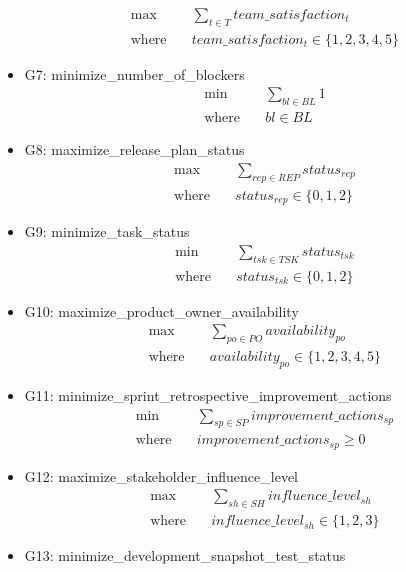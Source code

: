 \documentclass{article}
\begin{document}
\begin{itemize}
\begin{align*}
            \max \quad & \sum_{t \in T} team\_satisfaction_{t} \\
            \text{where} \quad & team\_satisfaction_{t} \in \{1, 2, 3, 4, 5\}
        \end{align*}
    \item G7: minimize\_number\_of\_blockers
        \begin{align*}
            \min \quad & \sum_{bl \in BL} 1 \\
            \text{where} \quad & bl \in BL
        \end{align*}
    \item G8: maximize\_release\_plan\_status
        \begin{align*}
            \max \quad & \sum_{rep \in REP} status_{rep} \\
            \text{where} \quad & status_{rep} \in \{0, 1, 2\}
        \end{align*}
    \item G9: minimize\_task\_status
        \begin{align*}
            \min \quad & \sum_{tsk \in TSK} status_{tsk} \\
            \text{where} \quad & status_{tsk} \in \{0, 1, 2\}
        \end{align*}
    \item G10: maximize\_product\_owner\_availability
        \begin{align*}
            \max \quad & \sum_{po \in PO} availability_{po} \\
            \text{where} \quad & availability_{po} \in \{1, 2, 3, 4, 5\}
        \end{align*}
    \item G11: minimize\_sprint\_retrospective\_improvement\_actions
        \begin{align*}
            \min \quad & \sum_{sp \in SP} improvement\_actions_{sp} \\
            \text{where} \quad & improvement\_actions_{sp} \geq 0
        \end{align*}
    \item G12: maximize\_stakeholder\_influence\_level
        \begin{align*}
            \max \quad & \sum_{sh \in SH} influence\_level_{sh} \\
            \text{where} \quad & influence\_level_{sh} \in \{1, 2, 3\}
        \end{align*}
    \item G13: minimize\_development\_snapshot\_test\_status

\end{itemize}
\end{document}
